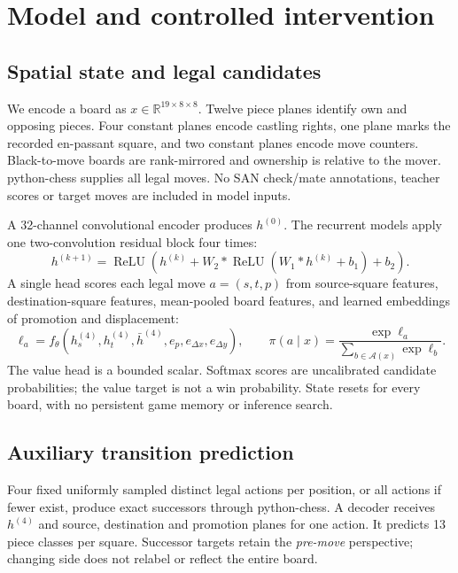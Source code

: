 \documentclass[10pt]{article}
\begin{document}
\section{Model and controlled intervention}
\subsection{Spatial state and legal candidates}
We encode a board as $x\in\mathbb{R}^{19\times8\times8}$. Twelve piece planes
identify own and opposing pieces. Four constant planes encode castling rights,
one plane marks the recorded en-passant square, and two constant planes encode
move counters. Black-to-move boards are rank-mirrored and ownership is relative
to the mover. python-chess supplies all legal moves. No SAN check/mate annotations,
teacher scores or target moves are included in model inputs.

A 32-channel convolutional encoder produces $h^{(0)}$. The recurrent models apply
one two-convolution residual block four times:
\begin{equation}
 h^{(k+1)}=\operatorname{ReLU}\!\left(h^{(k)}+
 W_2*\operatorname{ReLU}(W_1*h^{(k)}+b_1)+b_2\right).
\end{equation}
A single head scores each legal move $a=(s,t,p)$ from source-square features,
destination-square features, mean-pooled board features, and learned embeddings
of promotion and displacement:
\begin{equation}
 \ell_a=f_\theta\!\left(h_s^{(4)},h_t^{(4)},\bar h^{(4)},e_p,e_{\Delta x},e_{\Delta y}\right),
 \qquad \pi(a\mid x)=\frac{\exp\ell_a}{\sum_{b\in\mathcal A(x)}\exp\ell_b}.
\end{equation}
The value head is a bounded scalar. Softmax scores are uncalibrated candidate
probabilities; the value target is not a win probability. State resets for every
board, with no persistent game memory or inference search.

\subsection{Auxiliary transition prediction}
Four fixed uniformly sampled distinct legal actions per position, or all actions
if fewer exist, produce exact successors through python-chess. A decoder receives
$h^{(4)}$ and source, destination and promotion planes for one action. It predicts
13 piece classes per square. Successor targets retain the \emph{pre-move}
perspective; changing side does not relabel or reflect the entire board.
\end{document}
